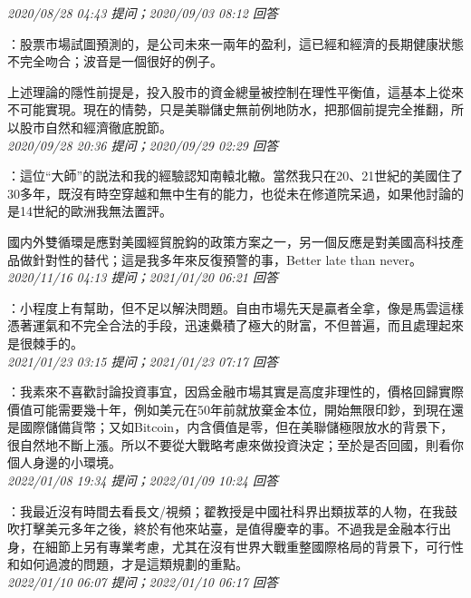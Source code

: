 \documentclass[twocolumn]{ctexart}
\begin{document}
\textit{\hfill\noindent\small 2020/08/28 04:43 提问；2020/09/03 08:12 回答}

：股票市場試圖預測的，是公司未來一兩年的盈利，這已經和經濟的長期健康狀態不完全吻合；波音是一個很好的例子。

上述理論的隱性前提是，投入股市的資金總量被控制在理性平衡值，這基本上從來不可能實現。現在的情勢，只是美聯儲史無前例地防水，把那個前提完全推翻，所以股市自然和經濟徹底脫節。
\\

\textit{\hfill\noindent\small 2020/09/28 20:36 提问；2020/09/29 02:29 回答}

：這位“大師”的説法和我的經驗認知南轅北轍。當然我只在20、21世紀的美國住了30多年，既沒有時空穿越和無中生有的能力，也從未在修道院呆過，如果他討論的是14世紀的歐洲我無法置評。

國内外雙循環是應對美國經貿脫鈎的政策方案之一，另一個反應是對美國高科技產品做針對性的替代；這是我多年來反復預警的事，Better late than never。
\\

\textit{\hfill\noindent\small 2020/11/16 04:13 提问；2021/01/20 06:21 回答}

：小程度上有幫助，但不足以解決問題。自由市場先天是贏者全拿，像是馬雲這樣憑著運氣和不完全合法的手段，迅速纍積了極大的財富，不但普遍，而且處理起來是很棘手的。
\\

\textit{\hfill\noindent\small 2021/01/23 03:15 提问；2021/01/23 07:17 回答}

：我素來不喜歡討論投資事宜，因爲金融市場其實是高度非理性的，價格回歸實際價值可能需要幾十年，例如美元在50年前就放棄金本位，開始無限印鈔，到現在還是國際儲備貨幣；又如Bitcoin，内含價值是零，但在美聯儲極限放水的背景下，很自然地不斷上漲。所以不要從大戰略考慮來做投資決定；至於是否回國，則看你個人身邊的小環境。
\\

\textit{\hfill\noindent\small 2022/01/08 19:34 提问；2022/01/09 10:24 回答}

：我最近沒有時間去看長文/視頻；翟教授是中國社科界出類拔萃的人物，在我鼓吹打擊美元多年之後，終於有他來站臺，是值得慶幸的事。不過我是金融本行出身，在細節上另有專業考慮，尤其在沒有世界大戰重整國際格局的背景下，可行性和如何過渡的問題，才是這類規劃的重點。
\\

\textit{\hfill\noindent\small 2022/01/10 06:07 提问；2022/01/10 06:17 回答}
\end{document}

